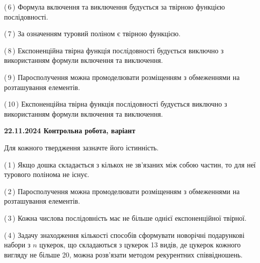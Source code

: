 \documentclass[12pt, ukrainian]{article}
\begin{document}
\begin {large}
\begin {large}
\begin {large}
\begin {large}
\begin {large}
\begin {large}
\begin {large}
\begin {large}
\begin {large}
\begin {large}
\begin {large}
\begin {large}
\begin {large}
\begin {large}
\begin {large}
\begin {large}
\begin {large}
\begin {large}
\begin {large}
\begin {large}
\begin {large}
\begin {large}
\begin {large}
\begin {large}
\begin {large}
\begin {large}
\begin {large}
\begin {large}
\begin {large}
\begin {large}
\begin {large}
\begin {large}
\begin {large}
\begin {large}
{(\,6\,) Формула включення та виключення будується за твірною функцією послідовності.%



(\,7\,) За означенням туровий поліном є твірною функцією.%



(\,8\,) Експоненційна твірна функція послідовності будується виключно з використанням формули включення та виключення.%



(\,9\,) Паросполучення можна промоделювати розміщенням з обмеженнями на розташування елементів.%



(\,10\,) Експоненційна твірна функція послідовності будується виключно з використанням формули включення та виключення.%




\vspace{5mm}
}
\newpage

\begin {large}

\textbf{22.11.2024 Контрольна робота, варіант  }\par


{
Для кожного твердження зазначте його істинність.\par

\vspace{2mm}

(\,1\,) Якщо дошка складається з кількох не зв’язаних між собою частин, то для неї турового полінома не існує.%



(\,2\,) Паросполучення можна промоделювати розміщенням з обмеженнями на розташування елементів.%



(\,3\,) Кожна числова послідовність має не більше однієї  експоненційної твірної.%



(\,4\,) Задачу знаходження кількості способів сформувати новорічні подарункові набори з $n$ цукерок, що складаються з цукерок 13 видів, де цукерок кожного вигляду не більше 20, можна розв’язати методом рекурентних співвідношень.%



}
\end{large}
\end{large}
\end{large}
\end{large}
\end{large}
\end{large}
\end{large}
\end{large}
\end{large}
\end{large}
\end{large}
\end{large}
\end{large}
\end{large}
\end{large}
\end{large}
\end{large}
\end{large}
\end{large}
\end{large}
\end{large}
\end{large}
\end{large}
\end{large}
\end{large}
\end{large}
\end{large}
\end{large}
\end{large}
\end{large}
\end{large}
\end{large}
\end{large}
\end{large}
\end{large}
\end{document}
